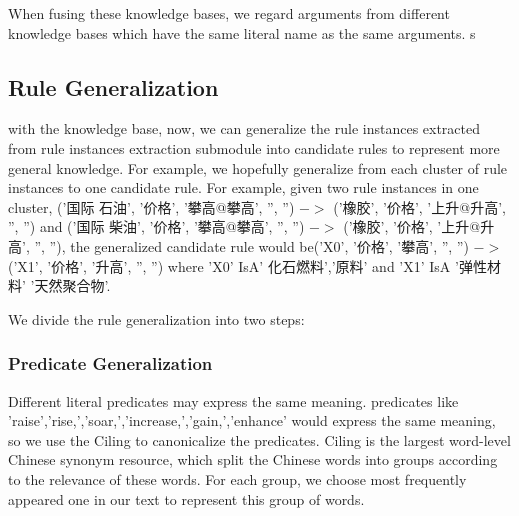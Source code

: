 
When fusing these knowledge bases, we regard arguments from different knowledge bases which have the same literal name as the same arguments.
s
\subsection{Rule Generalization}
with the knowledge base, now, we can generalize the rule instances extracted from rule instances extraction submodule into candidate rules to represent more general knowledge. For example, we hopefully generalize from each cluster of rule instances to one candidate rule. For example, given two rule instances in one cluster, ('国际 石油', '价格', '攀高@攀高', '', '') $->$ ('橡胶', '价格', '上升@升高', '', '') and ('国际 柴油', '价格', '攀高@攀高', '', '') $->$ ('橡胶', '价格', '上升@升高', '', ''), the generalized candidate rule would be('X0', '价格', '攀高', '', '') $->$ ('X1', '价格', '升高', '', '') where 'X0' IsA' 化石燃料','原料' and  'X1' IsA '弹性材料' '天然聚合物'.

We divide the rule generalization into two steps:
\subsubsection{Predicate Generalization}
Different literal predicates may express the same meaning. predicates like 'raise','rise,','soar,','increase,','gain,','enhance' would express the same meaning, so we use the Ciling to canonicalize the predicates. Ciling is the largest word-level Chinese synonym resource, which split the Chinese words into groups according to the relevance of these words. For each group, we choose most frequently appeared one in our text to represent this group of words.

